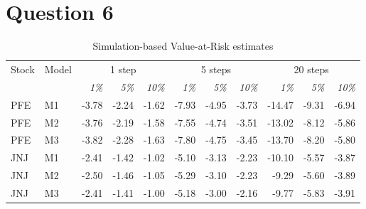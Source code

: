 \documentclass[a4paper, 12pt]{article}
\theoremstyle{definition}
\begin{document}
\section*{Question 6}
\begin{table}[H]
    \centering
    \caption{Simulation-based Value-at-Risk estimates}
    \label{tab:q6_var}

    \small
    \setlength{\tabcolsep}{4pt}
    \renewcommand{\arraystretch}{1.15}

    \begin{tabular*}{\textwidth}{
    @{\extracolsep{\fill}}
    ll
    rrrrrrrrr
    }
        \toprule

        Stock & Model
        & \multicolumn{3}{c}{1 step}
        & \multicolumn{3}{c}{5 steps}
        & \multicolumn{3}{c}{20 steps}
        \\

        \cmidrule(lr){3-5}
        \cmidrule(lr){6-8}
        \cmidrule(lr){9-11}

        &
        & \textit{1\%} & \textit{5\%} & \textit{10\%}
        & \textit{1\%} & \textit{5\%} & \textit{10\%}
        & \textit{1\%} & \textit{5\%} & \textit{10\%}
        \\

        \midrule

        PFE & M1
        & -3.78 & -2.24 & -1.62
        & -7.93 & -4.95 & -3.73
        & -14.47 & -9.31 & -6.94
        \\

        PFE & M2
        & -3.76 & -2.19 & -1.58
        & -7.55 & -4.74 & -3.51
        & -13.02 & -8.12 & -5.86
        \\

        PFE & M3
        & -3.82 & -2.28 & -1.63
        & -7.80 & -4.75 & -3.45
        & -13.70 & -8.20 & -5.80
        \\

        \addlinespace[0.8em]

        JNJ & M1
        & -2.41 & -1.42 & -1.02
        & -5.10 & -3.13 & -2.23
        & -10.10 & -5.57 & -3.87
        \\

        JNJ & M2
        & -2.50 & -1.46 & -1.05
        & -5.29 & -3.10 & -2.23
        & -9.29 & -5.60 & -3.89
        \\

        JNJ & M3
        & -2.41 & -1.41 & -1.00
        & -5.18 & -3.00 & -2.16
        & -9.77 & -5.83 & -3.91
        \\


\end{tabular*}
\end{table}
\end{document}
